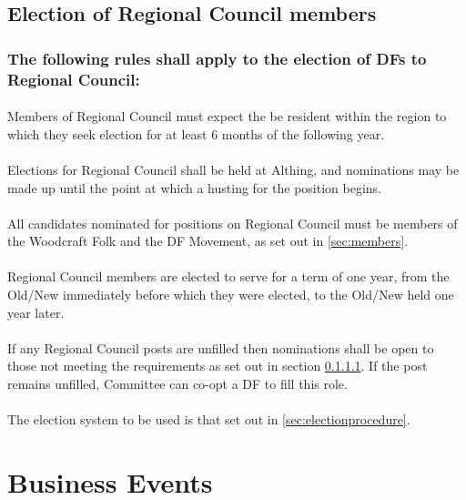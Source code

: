 \documentclass[a4paper, 12pt]{report}
\begin{document}
\subsection{Election of Regional Council members}
\subsubsection{The following rules shall apply to the election of DFs to Regional Council:}
\paragraph{}
\label{sec:regionalresidency}
Members of Regional Council must expect the be resident within the region to which they seek election for at least 6 months of the following year.
\paragraph{}
Elections for Regional Council shall be held at Althing, and nominations may be made up until the point at which a husting for the position begins.
\paragraph{}
All candidates nominated for positions on Regional Council must be members of the Woodcraft Folk and the DF Movement, as set out in \ref{sec:members}.
\paragraph{}
Regional Council members are elected to serve for a term of one year, from the Old/New immediately before which they were elected, to the Old/New held one year later.
\paragraph{}
If any Regional Council posts are unfilled then nominations shall be open to those not meeting the requirements as set out in section \ref{sec:regionalresidency}. If the post remains unfilled, Committee can co-opt a DF to fill this role.
\paragraph{}
The election system to be used is that set out in \ref{sec:electionprocedure}.

\section{Business Events}
\label{sec:business}
\end{document}
